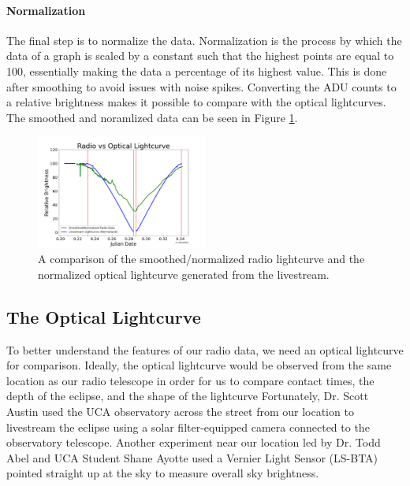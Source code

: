 \paragraph{Normalization}
The final step is to normalize the data.
Normalization is the process by which the data of a graph is scaled by a constant such that the highest points are equal to 100, essentially making the data a percentage of its highest value.
This is done after smoothing to avoid issues with noise spikes.
Converting the ADU counts to a relative brightness makes it possible to compare with the optical lightcurves.
The smoothed and noramlized data can be seen in Figure \ref{fig:RadioOpticalComparison}.

\begin{figure}[h]
    \includegraphics[width=0.5\textwidth]{figures/radioOpticalComparison}
    \caption{\label{fig:RadioOpticalComparison} A comparison of the smoothed/normalized radio lightcurve and the normalized optical lightcurve generated from the livestream.}
\end{figure}

\subsection{\label{sec:optical}The Optical Lightcurve}

To better understand the features of our radio data, we need an optical lightcurve for comparison.
Ideally, the optical lightcurve would be observed from the same location as our radio telescope in order for us to compare contact times, the depth of the eclipse, and the shape of the lightcurve
Fortunately, Dr. Scott Austin used the UCA observatory across the street from our location to livestream the eclipse using a solar filter-equipped camera connected to the observatory telescope.
Another experiment near our location led by Dr. Todd Abel and UCA Student Shane Ayotte used a Vernier Light Sensor (LS-BTA) pointed straight up at the sky to measure overall sky brightness.
